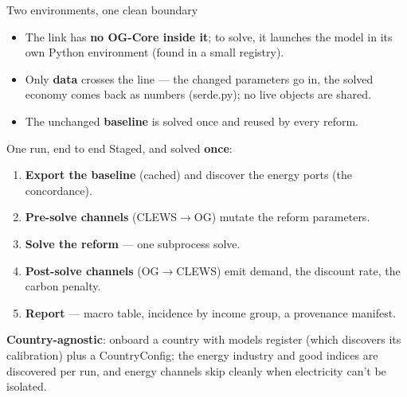 \documentclass[aspectratio=169,11pt]{beamer}
\newcommand{\code}[1]{{\ttfamily\small #1}}
\begin{document}
\begin{frame}{Two environments, one clean boundary}
  \centering
  \par\medskip
  \begin{itemize}\setlength\itemsep{6pt}\small
    \item The link has \textbf{no OG-Core inside it}; to solve, it launches the model in its own Python
          environment (found in a small registry).
    \item Only \textbf{data} crosses the line --- the changed parameters go in, the solved economy comes
          back as numbers (\code{serde.py}); no live objects are shared.
    \item The unchanged \textbf{baseline} is solved once and reused by every reform.
  \end{itemize}
\end{frame}

\begin{frame}{One run, end to end}
  Staged, and solved \textbf{once}:
  \medskip
  \begin{enumerate}\setlength\itemsep{5pt}\small
    \item \textbf{Export the baseline} (cached) and discover the energy ports (the concordance).
    \item \textbf{Pre-solve channels} (CLEWS$\to$OG) mutate the reform parameters.
    \item \textbf{Solve the reform} --- one subprocess solve.
    \item \textbf{Post-solve channels} (OG$\to$CLEWS) emit demand, the discount rate, the carbon penalty.
    \item \textbf{Report} --- macro table, incidence by income group, a provenance manifest.
  \end{enumerate}
  \vfill
  {\footnotesize\color{sub}\textbf{Country-agnostic}: onboard a country with \code{models register} (which
  discovers its calibration) plus a \code{CountryConfig}; the energy industry and good indices are discovered
  per run, and energy channels skip cleanly when electricity can't be isolated.}
\end{frame}
\end{document}
